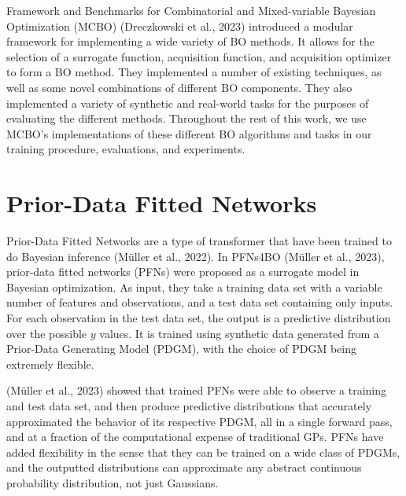 \documentclass[12pt,twoside]{reedthesis}
\begin{document}
Framework and Benchmarks for Combinatorial and Mixed-variable Bayesian Optimization (MCBO) (Dreczkowski et al., 2023) introduced a modular framework for implementing a wide variety of BO methods. It allows for the selection of a surrogate function, acquisition function, and acquisition optimizer to form a BO method. They implemented a number of existing techniques, as well as some novel combinations of different BO components. They also implemented a variety of synthetic and real-world tasks for the purposes of evaluating the different methods. Throughout the rest of this work, we use MCBO's implementations of these different BO algorithms and tasks in our training procedure, evaluations, and experiments.

\hypertarget{pfnBackground}{%
\section{Prior-Data Fitted Networks}\label{pfnBackground}}

Prior-Data Fitted Networks are a type of transformer that have been trained to do Bayesian inference (Müller et al., 2022). In PFNs4BO (Müller et al., 2023), prior-data fitted networks (PFNs) were proposed as a surrogate model in Bayesian optimization. As input, they take a training data set with a variable number of features and observations, and a test data set containing only inputs. For each observation in the test data set, the output is a predictive distribution over the possible \(y\) values. It is trained using synthetic data generated from a Prior-Data Generating Model (PDGM), with the choice of PDGM being extremely flexible.

(Müller et al., 2023) showed that trained PFNs were able to observe a training and test data set, and then produce predictive distributions that accurately approximated the behavior of its respective PDGM, all in a single forward pass, and at a fraction of the computational expense of traditional GPs. PFNs have added flexibility in the sense that they can be trained on a wide class of PDGMs, and the outputted distributions can approximate any abstract continuous probability distribution, not just Gaussians.
\end{document}
